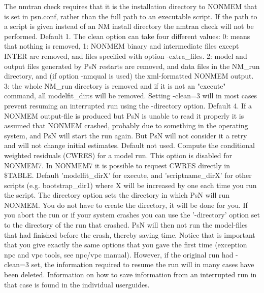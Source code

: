 \begin{optionlist}
The nmtran check requires that it is the installation directory to NONMEM that is set in psn.conf, rather than the full path to an executable script. If the path to a script is given instead of an NM install directory the nmtran check will not be performed.
\nextopt
{}
Default 1. The clean option can take four different values:  0: means that nothing is removed, 1: NONMEM binary and intermediate files except INTER are removed, and files specified with option -extra\_files. 2: model and output files generated by PsN restarts are removed, and data files in the NM\_run directory, and (if option -nmqual is used) the xml-formatted NONMEM output. 3: the whole NM\_run directory is removed and if it is not an "execute" command, all modelfit\_dir:s will be removed. Setting -clean=3 will in most cases prevent resuming an interrupted run using the -directory option.
\nextopt
{}
Default 4. If a NONMEM output-file is produced but PsN is unable to read it properly it is assumed that NONMEM crashed, probably due to something in the operating system, and PsN will start the run again. But PsN will not consider it a retry and will not change initial estimates. 
\nextopt
{}
Default not used. Compute the conditional weighted residuals (CWRES) for a model run. This option is disabled for NONMEM7. In NONMEM7 it is possible to request CWRES directly in \$TABLE. 
\nextopt
{}
Default 'modelfit\_dirX' for execute, and 'scriptname\_dirX' for other scripts (e.g. bootstrap\_dir1) where X will be increased by one each time you run the script. The directory option sets the directory in which PsN will run  NONMEM. You do not have to create the directory,  it will be done for you. If you abort the run or if your system crashes you can use the '-directory' option set to the directory of the run that crashed. PsN will then not run the model-files that had finished before the crash, thereby saving time. Notice that is important that you give exactly the same options that you gave the first time (exception npc and vpc tools, see npc/vpc manual). However, if the original run had -clean=3 set, the information required to resume the run will in many cases have been deleted. Information on how to save information from an interrupted run in that case is found in the individual userguides.

\end{optionlist}
